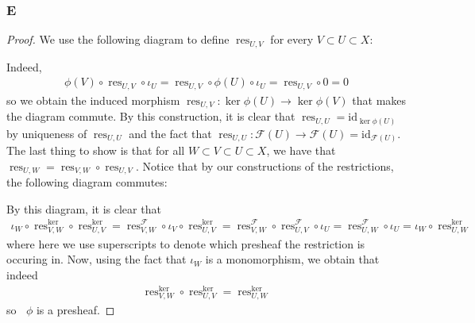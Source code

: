 \documentclass{article}
\newcommand{\id}{\mathrm{id}}
\newcommand{\fF}{\mathscr{F}}
\newcommand{\fG}{\mathscr{G}}
\DeclareMathOperator{\res}{\mathrm{res}}
\DeclareMathOperator{\kerpre}{\ker_{\text{pre}}}
\begin{document}
\subsubsection{E}\label{2.3.E}
\begin{proof}
    We use the following diagram to define $\res_{U,V}$ for every $V\subset U\subset X$:
    \begin{center}
    \end{center}
    Indeed,
    \begin{align*}
        \phi(V)\circ \res_{U,V}\circ \iota_U=\res_{U,V}\circ \phi(U)\circ \iota_U=\res_{U,V}\circ 0=0
    \end{align*}
    so we obtain the induced morphism $\res_{U,V}:\ker \phi(U)\to \ker \phi(V)$ that makes the diagram commute. By this construction, it is clear that $\res_{U,U}=\id_{\ker \phi(U)}$ by uniqueness of $\res_{U,U}$ and the fact that $\res_{U,U}:\fF(U)\to \fF(U)=\id_{\fF(U)}$. The last thing to show is that for all $W\subset V\subset U\subset X$, we have that $\res_{U,W}=\res_{V,W}\circ \res_{U,V}$. Notice that by our constructions of the restrictions, the following diagram commutes:
    \begin{center}
    \end{center}
    By this diagram, it is clear that
    \begin{align*}
        \iota_W\circ \res_{V,W}^{\ker}\circ \res_{U,V}^{\ker}=\res_{V,W}^\fF \circ \iota_V\circ \res_{U,V}^{\ker}=\res_{V,W}^\fF \circ \res_{U,V}^\fF \circ \iota_U=\res_{U,W}^\fF \circ \iota_U=\iota_W\circ \res_{U,W}^{\ker }
    \end{align*}
    where here we use superscripts to denote which presheaf the restriction is occuring in. Now, using the fact that $\iota_W$ is a monomorphism, we obtain that indeed
    \begin{align*}
        \res_{V,W}^{\ker}\circ \res_{U,V}^{\ker}=\res_{U,W}^{\ker}
    \end{align*}
    so $\kerpre \phi$ is a presheaf.
\end{proof}
\end{document}
